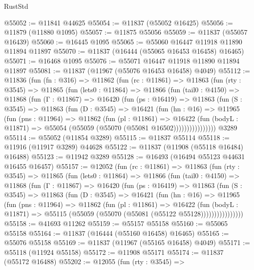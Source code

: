 \begin{lexlean}{RustStd}
\begin{coremodule}
{\begin{coremodule}
{{{{{{{{{{{{{{{{{{{{{{{{{{{{{{{{{{{{{{{{{{{{{{{{{{@55052 := @11841 @44625
@55054 := @11837 (@55052 @16425)
@55056 := @11879 (@11880 @1095)
@55057 := @11875 @55056
@55059 := @11837 (@55057 @16439)
@55060 := @16445 @1095
@55065 := @55060 @16447 @11918 @11890 @11894 @11897
@55070 := @11837 (@16444 (@55065 @16453 @16458) @16465)
@55071 := @16468 @1095
@55076 := @55071 @16447 @11918 @11890 @11894 @11897
@55081 := @11837 (@11967 (@55076 @16453 @16458) @4049)
@55112 := @11836
    (fun (fn : @316) =>
    @11862
      (fun (rc : @11861) =>
      @11863
        (fun (rty : @3545) =>
        @11865
          (fun (lets0 : @11864) =>
          @11866
            (fun (tail0 : @4150) =>
            @11868
              (fun (Γ : @11867) =>
              @16420
                (fun (ps : @16419) =>
                @11863
                  (fun (S : @3545) =>
                  @11863
                    (fun (D : @3545) =>
                    @16421
                      (fun (hn : @16) =>
                      @11965
                        (fun (pns : @11964) =>
                        @11862
                          (fun (pl : @11861) =>
                          @16422
                            (fun (bodyL : @11871) =>
                            @55054 (@55059 (@55070 (@55081 @16502))))))))))))))))
    @3289
@55114 := @55052 (@11854 @3289)
@55115 := @11837 @55114
@55118 := @11916 (@11917 @3289) @44628
@55122 := @11837 (@11908 (@55118 @16484) @16488)
@55123 := @11942 @3289
@55128 := @16493 (@16494 @55123 @44631 @16455 @16457)
@55157 := @12052
    (fun (rc : @11861) =>
    @11863
      (fun (rty : @3545) =>
      @11865
        (fun (lets0 : @11864) =>
        @11866
          (fun (tail0 : @4150) =>
          @11868
            (fun (Γ : @11867) =>
            @16420
              (fun (ps : @16419) =>
              @11863
                (fun (S : @3545) =>
                @11863
                  (fun (D : @3545) =>
                  @16421
                    (fun (hn : @16) =>
                    @11965
                      (fun (pns : @11964) =>
                      @11862
                        (fun (pl : @11861) =>
                        @16422
                          (fun (bodyL : @11871) =>
                          @55115 (@55059 (@55070 (@55081 (@55122 @55128))))))))))))))))
@55158 := @41693 @11262
@55159 := @55157 @55158
@55160 := @55065 @55158
@55164 := @11837 (@16444 (@55160 @16458) @16465)
@55165 := @55076 @55158
@55169 := @11837 (@11967 (@55165 @16458) @4049)
@55171 := @55118 (@11924 @55158)
@55172 := @11908 @55171
@55174 := @11837 (@55172 @16488)
@55202 := @12055
    (fun (rty : @3545) =>
}}}}}}}}}}}}}}}}}}}}}}}}}}}}}}}}}}}}}}}}}}}}}}}}}}
\end{coremodule}}
\end{coremodule}
\end{lexlean}

